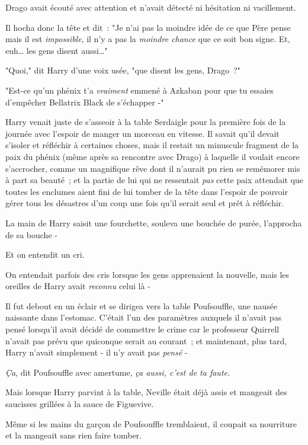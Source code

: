 Drago avait écouté avec attention et n'avait détecté ni hésitation ni vacillement.

Il hocha donc la tête et dit~: "Je n'ai pas la moindre idée de ce que Père pense mais il est \emph{impossible}, il n'y a pas la \emph{moindre chance} que ce soit bon signe. Et, euh… les gens disent aussi…"

"Quoi," dit Harry d'une voix usée, "que disent les gens, Drago~?"

"Est-ce qu'un phénix t'a \emph{vraiment} emmené à Azkaban pour que tu essaies d'empêcher Bellatrix Black de s'échapper -"


Harry venait juste de s'asseoir à la table Serdaigle pour la première fois de la journée avec l'espoir de manger un morceau en vitesse. Il savait qu'il devait s'isoler et réfléchir à certaines choses, mais il restait un minuscule fragment de la paix du phénix (même après sa rencontre avec Drago) à laquelle il voulait encore s'accrocher, comme un magnifique rêve dont il n'aurait pu rien se remémorer mis à part sa beauté~; et la partie de lui qui ne ressentait \emph{pas} cette paix attendait que toutes les enclumes aient fini de lui tomber de la tête dans l'espoir de pouvoir gérer tous les désastres d'un coup une fois qu'il serait seul et prêt à réfléchir.

La main de Harry saisit une fourchette, souleva une bouchée de purée, l'approcha de sa bouche -

Et on entendit un cri.

On entendait parfois des cris lorsque les gens apprenaient la nouvelle, mais les oreilles de Harry avait \emph{reconnu} celui là -

Il fut debout en un éclair et se dirigea vers la table Poufsouffle, une nausée naissante dans l'estomac. C'était l'un des paramètres auxquels il n'avait pas pensé lorsqu'il avait décidé de commettre le crime car le professeur Quirrell n'avait pas prévu que quiconque serait au courant~; et maintenant, plus tard, Harry n'avait simplement - il n'y avait pas \emph{pensé} -

\emph{Ça}, dit Poufsouffle avec amertume, \emph{ça aussi, c'est de ta faute.}

Mais lorsque Harry parvint à la table, Neville était déjà assis et mangeait des saucisses grillées à la sauce de Figuevive.

Même si les mains du garçon de Poufsouffle tremblaient, il coupait sa nourriture et la mangeait sans rien faire tomber.

